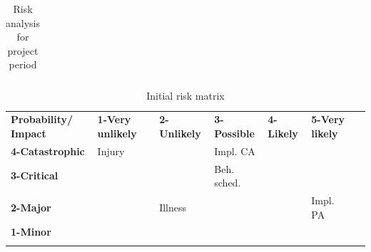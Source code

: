 \documentclass[informationsecurity]{gucmasterproject}
\begin{document}
\begin{table}[H]
\begin{tabular}{c| p{1.3cm}|p{1.5cm}|p{0.94cm}|p{2.5cm}|p{2.2cm}|p{1.7cm}|}
\end{tabular}
\caption{Risk analysis for project period}
\label{tab:risk-analysis}
\end{table}

\begin{table}[H]
\centering
\scriptsize
\begin{tabular}{|m{1.75cm}|m{1.75cm}|m{1.75cm}| m{1.75cm} |m{1.75cm}| m{1.75cm}|m{0cm}}
\hhline{|------|} \bf Probability/ Impact & \bf 1-Very unlikely & \bf 2-Unlikely & \bf 3-Possible & \bf 4-Likely & \bf 5-Very likely & \\[10pt]

\hhline{|------|} \bf 4-Catastrophic & \cellcolor{yellow!50} \centering Injury & \cellcolor{red!50}  & \cellcolor{red!50} \centering Impl. CA & \cellcolor{red!50} &\cellcolor{red!50} & \\ [10pt]

\hhline{|------|} \bf 3-Critical &\cellcolor{green!50} & \cellcolor{yellow!50} & \cellcolor{yellow!50} \centering Beh. sched. & \cellcolor{red!50} &\cellcolor{red!50} & \\ [10pt]

\hhline{|------|} \bf 2-Major & \cellcolor{green!50} & \cellcolor{green!50} \centering Illness & \cellcolor{yellow!50} &\cellcolor{yellow!50} &\cellcolor{red!50} \centering Impl. PA & \\[10pt]

\hhline{|------|} \bf 1-Minor & \cellcolor{green!50} & \cellcolor{green!50} & \cellcolor{green!50} &\cellcolor{yellow!50} &\cellcolor{yellow!50} & \\ [10pt]
\hhline{|------|}
\end{tabular} \\
\caption{Initial risk matrix}
\label{tab:initial-risk}
\end{table}
\end{document}
